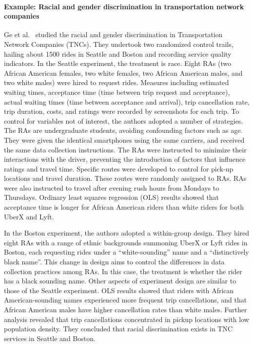 \documentclass[11pt]{article}
\begin{document}
\paragraph{Example: Racial and gender discrimination in transportation network companies}
Ge et al.~\cite{ge2016racial} studied the racial and gender discrimination in Transportation Network Companies (TNCs). They undertook two randomized control trails, hailing about 1500 rides in Seattle and Boston and recording service quality indicators. In the  Seattle experiment, the treatment is race. Eight RAs (two African American females, two white females, two African American males, and two white males) were hired to request rides. Measures including estimated waiting times, acceptance time (time between trip request and acceptance), actual waiting times (time between acceptance and arrival), trip cancellation rate, trip duration, costs, and ratings were recorded by screenshots for each trip. To control for variables not of interest, the authors adopted a number of strategies. The RAs are undergraduate students, avoiding confounding factors such as age. They were given the identical smartphones using the same carriers, and received the same data collection instructions. The RAs were instructed to minimize their interactions with the driver, preventing the introduction of factors that influence ratings and travel time. Specific routes were developed to control for pick-up locations and travel duration. These routes were randomly assigned to RAs. RAs were also instructed to travel after evening rush hours from Mondays to Thursdays. Ordinary least squares regression (OLS) results showed that acceptance time is longer for African American riders than white riders for both UberX and Lyft. 

In the Boston experiment, the authors adopted a within-group design. They hired eight RAs with a range of ethnic backgrounds summoning UberX or Lyft rides in Boston, each requesting rides under a “white-sounding” name and a “distinctively black name”. This change in design aims to control the differences in data collection practices among RAs. In this case, the treatment is whether the rider has a black sounding name. Other aspects of experiment design are similar to those of the Seattle experiment. OLS results showed that riders with African American-sounding names experienced more frequent trip cancellations, and that African American males have higher cancellation rates than white males. Further analysis revealed that trip cancellations concentrated in pickup locations with low population density. They concluded that racial discrimination exists in TNC services in Seattle and Boston.
\end{document}

